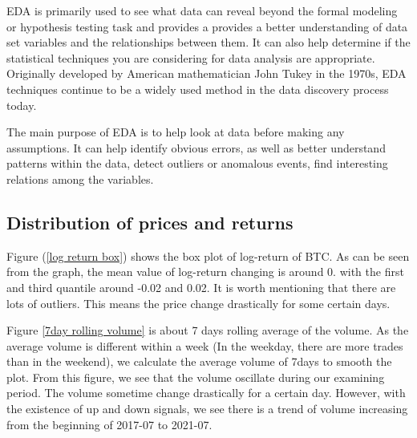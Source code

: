 \documentclass[twoside]{report}
\begin{document}
\begin{spacing}{1}
EDA is primarily used to see what data can reveal beyond the formal modeling or hypothesis testing task and provides a provides a better understanding of data set variables and the relationships between them. It can also help determine if the statistical techniques you are considering for data analysis are appropriate. Originally developed by American mathematician John Tukey in the 1970s, EDA techniques continue to be a widely used method in the data discovery process today.

The main purpose of EDA is to help look at data before making any assumptions. It can help identify obvious errors, as well as better understand patterns within the data, detect outliers or anomalous events, find interesting relations among the variables.



\subsection{Distribution of prices and returns}




Figure (\ref{log return box}) shows the box plot of log-return of BTC. As can be seen from the graph, the mean value of log-return changing is around 0. with the first and third quantile around -0.02 and 0.02. It is worth mentioning that there are lots of outliers. This means the price change drastically for some certain days.



Figure \ref{7day rolling volume} is about 7 days rolling average of the volume. As the average volume is different within a week (In the weekday, there are more trades than in the weekend), we calculate the average volume of 7days to smooth the plot. From this figure, we see that the volume oscillate during our examining period. The volume sometime change drastically for a certain day. However, with the existence of up and down signals, we see there is a trend of volume increasing from the beginning of 2017-07 to 2021-07.



\end{spacing}
\end{document}
